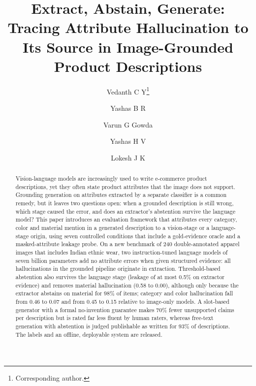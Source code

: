 \documentclass[runningheads]{llncs}
\newif\ifanonymous
\begin{document}
\title{Extract, Abstain, Generate: Tracing Attribute Hallucination to Its Source in Image-Grounded Product Descriptions}

\ifanonymous
\author{Anonymous Authors}
\authorrunning{Anonymous Authors}
\institute{Anonymous Institution}
\newcommand{\appname}{the deployed web application}
\else
\author{Vedanth C Y\thanks{Corresponding author.} \and Yashas B R \and Varun G Gowda \and Yashas H V \and Lokesh J K}
\newcommand{\appname}{the TrueTag web application}
\fi

\maketitle

\begin{abstract}
Vision-language models are increasingly used to write e-commerce product descriptions, yet they often state product attributes that the image does not support. Grounding generation on attributes extracted by a separate classifier is a common remedy, but it leaves two questions open: when a grounded description is still wrong, which stage caused the error, and does an extractor's abstention survive the language model? This paper introduces an evaluation framework that attributes every category, color and material mention in a generated description to a vision-stage or a language-stage origin, using seven controlled conditions that include a gold-evidence oracle and a masked-attribute leakage probe. On a new benchmark of 240 double-annotated apparel images that includes Indian ethnic wear, two instruction-tuned language models of seven billion parameters add no attribute errors when given structured evidence: all hallucinations in the grounded pipeline originate in extraction.
Threshold-based abstention also survives the language stage (leakage of at most 0.5\% on extractor evidence) and removes material hallucination (0.58 to 0.00), although only because the extractor abstains on material for 98\% of items; category and color hallucination fall from 0.46 to 0.07 and from 0.45 to 0.15 relative to image-only models. A slot-based generator with a formal no-invention guarantee makes 70\% fewer unsupported claims per description but is rated far less fluent by human raters, whereas free-text generation with abstention is judged publishable as written for 93\% of descriptions. The labels and an offline, deployable system are released.
\end{abstract}
\end{document}
